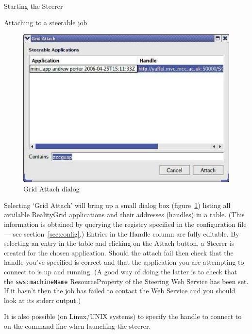 \documentclass[a4paper,twoside]{article}
\begin{document}
\begin{section}{Starting the Steerer}
\begin{subsection}{Attaching to a steerable job}
\begin{figure}
\centerline{\includegraphics{grid_attach.png}}
\caption{Grid Attach dialog}
\label{fig:grid_attach}
\end{figure}

Selecting `Grid Attach' will bring up a small dialog box
(figure~\ref{fig:grid_attach}) listing all available RealityGrid
applications and their addresses (handles) in a table.  (This
information is obtained by querying the registry specified in the
configuration file --- see section~\ref{sec:config}.) Entries in the
Handle column are fully editable.  By selecting an entry in the table
and clicking on the Attach button, a Steerer is created for the chosen
application. Should the attach fail then check that the handle you've
specified is correct and that the application you are attempting to
connect to is up and running.  (A good way of doing the latter is to
check that the \texttt{sws:machineName} ResourceProperty of the
Steering Web Service has been set.  If it hasn't then the job
has failed to contact the Web Service and you should look at its
stderr output.)

It is also possible (on Linux/UNIX systems) to specify the handle to
connect to on the command line when launching the steerer.

\end{subsection}
\end{section}

\end{document}
